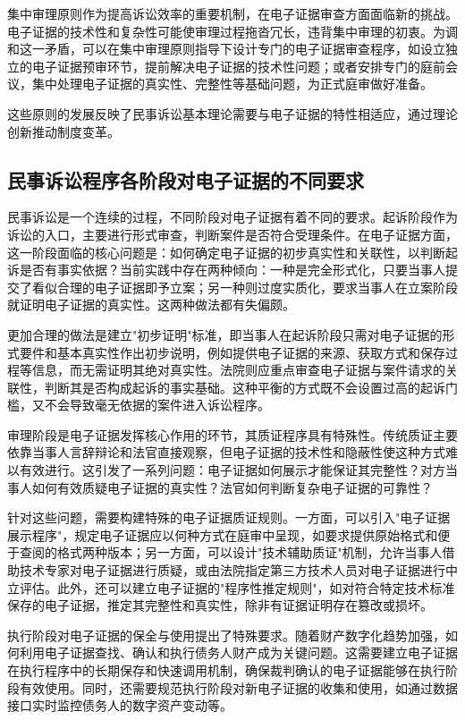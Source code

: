 集中审理原则作为提高诉讼效率的重要机制，在电子证据审查方面面临新的挑战。电子证据的技术性和复杂性可能使审理过程拖沓冗长，违背集中审理的初衷。为调和这一矛盾，可以在集中审理原则指导下设计专门的电子证据审查程序，如设立独立的电子证据预审环节，提前解决电子证据的技术性问题；或者安排专门的庭前会议，集中处理电子证据的真实性、完整性等基础问题，为正式庭审做好准备。

这些原则的发展反映了民事诉讼基本理论需要与电子证据的特性相适应，通过理论创新推动制度变革。

\subsection{民事诉讼程序各阶段对电子证据的不同要求}

民事诉讼是一个连续的过程，不同阶段对电子证据有着不同的要求。起诉阶段作为诉讼的入口，主要进行形式审查，判断案件是否符合受理条件。在电子证据方面，这一阶段面临的核心问题是：如何确定电子证据的初步真实性和关联性，以判断起诉是否有事实依据？当前实践中存在两种倾向：一种是完全形式化，只要当事人提交了看似合理的电子证据即予立案；另一种则过度实质化，要求当事人在立案阶段就证明电子证据的真实性。这两种做法都有失偏颇。

更加合理的做法是建立"初步证明"标准，即当事人在起诉阶段只需对电子证据的形式要件和基本真实性作出初步说明，例如提供电子证据的来源、获取方式和保存过程等信息，而无需证明其绝对真实性。法院则应重点审查电子证据与案件请求的关联性，判断其是否构成起诉的事实基础。这种平衡的方式既不会设置过高的起诉门槛，又不会导致毫无依据的案件进入诉讼程序。

审理阶段是电子证据发挥核心作用的环节，其质证程序具有特殊性。传统质证主要依靠当事人言辞辩论和法官直接观察，但电子证据的技术性和隐蔽性使这种方式难以有效进行。这引发了一系列问题：电子证据如何展示才能保证其完整性？对方当事人如何有效质疑电子证据的真实性？法官如何判断复杂电子证据的可靠性？

针对这些问题，需要构建特殊的电子证据质证规则。一方面，可以引入"电子证据展示程序"，规定电子证据应以何种方式在庭审中呈现，如要求提供原始格式和便于查阅的格式两种版本；另一方面，可以设计"技术辅助质证"机制，允许当事人借助技术专家对电子证据进行质疑，或由法院指定第三方技术人员对电子证据进行中立评估。此外，还可以建立电子证据的"程序性推定规则"，如对符合特定技术标准保存的电子证据，推定其完整性和真实性，除非有证据证明存在篡改或损坏。

执行阶段对电子证据的保全与使用提出了特殊要求。随着财产数字化趋势加强，如何利用电子证据查找、确认和执行债务人财产成为关键问题。这需要建立电子证据在执行程序中的长期保存和快速调用机制，确保裁判确认的电子证据能够在执行阶段有效使用。同时，还需要规范执行阶段对新电子证据的收集和使用，如通过数据接口实时监控债务人的数字资产变动等。

